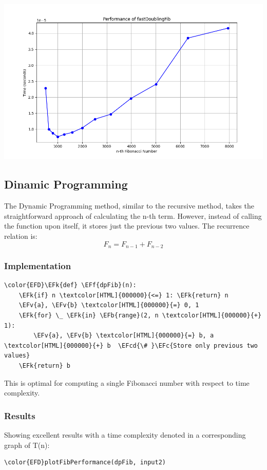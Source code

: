 \documentclass[a4paper,12pt]{article}
\newcommand{\EFc}[1]{\textcolor{EFc}{#1}} %
\newcommand{\EFcd}[1]{\textcolor{EFcd}{#1}} %
\newcommand{\EFk}[1]{\textcolor{EFk}{#1}} %
\newcommand{\EFb}[1]{\textcolor{EFb}{#1}} %
\newcommand{\EFf}[1]{\textcolor{EFf}{#1}} %
\newcommand{\EFv}[1]{\textcolor{EFv}{#1}} %
\begin{document}
\begin{center}
\includegraphics[width=.9\linewidth]{fastDoublingFib.png}
\label{orgfea65e2}
\end{center}
\subsection{Dinamic Programming}
\label{sec:orgfea5a7b}
The Dynamic Programming method, similar to the recursive method, takes the straightforward approach of calculating the n-th term. However, instead of calling the function upon itself, it stores just the previous two values. The recurrence relation is:
\[F_n = F_{n-1} + F_{n-2}\]
\subsubsection{Implementation}
\label{sec:org695147d}
\begin{Code}
\begin{Verbatim}
\color{EFD}\EFk{def} \EFf{dpFib}(n):
    \EFk{if} n \textcolor[HTML]{000000}{<=} 1: \EFk{return} n
    \EFv{a}, \EFv{b} \textcolor[HTML]{000000}{=} 0, 1
    \EFk{for} \_ \EFk{in} \EFb{range}(2, n \textcolor[HTML]{000000}{+} 1):
        \EFv{a}, \EFv{b} \textcolor[HTML]{000000}{=} b, a \textcolor[HTML]{000000}{+} b  \EFcd{\# }\EFc{Store only previous two values}
    \EFk{return} b
\end{Verbatim}
\end{Code}

This is optimal for computing a single Fibonacci number with respect to time complexity.
\subsubsection{Results}
\label{sec:orgb76e20f}
Showing excellent results with a time
complexity denoted in a corresponding graph of T(n):
\begin{Code}
\begin{Verbatim}
\color{EFD}plotFibPerformance(dpFib, input2)
\end{Verbatim}
\end{Code}
\end{document}
